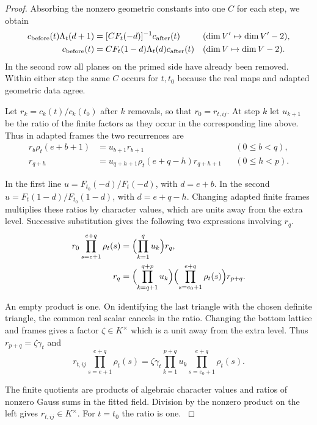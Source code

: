 \begin{proof}
Absorbing the nonzero geometric constants into one \(C\) for each
step, we obtain
\[
 \begin{aligned}
 c_{\rm before}(t)\Lambda_t(d+1)
       &=[C F_t(-d)]^{-1} c_{\rm after}(t)
       &&(\dim V'\mapsto\dim V'-2),\\
 c_{\rm before}(t)
       &= C F_t(1-d)\Lambda_t(d)c_{\rm after}(t)
       &&(\dim V\mapsto\dim V-2).
 \end{aligned}
\]
In the second row all planes on the primed side have already
been removed. Within either step the same \(C\) occurs for
\(t,t_0\) because the real maps and adapted geometric data agree.

Let \(r_k=c_k(t)/c_k(t_0)\) after \(k\) removals, so that
\(r_0=r_{t,ij}\). At step \(k\) let \(u_{k+1}\) be the ratio of
the finite factors as they occur in the corresponding line above.
Thus in adapted frames the two recurrences are
\[
\begin{aligned}
 r_b\rho_t(e+b+1)&=u_{b+1}r_{b+1} &&(0\le b<q),\\
 r_{q+h}&=u_{q+h+1}\rho_t(e+q-h)r_{q+h+1} &&(0\le h<p).
\end{aligned}
\]

In the first line \(u=F_{t_0}(-d)/F_t(-d)\), with \(d=e+b\).
In the second \(u=F_t(1-d)/F_{t_0}(1-d)\), with \(d=e+q-h\).
Changing adapted finite frames multiplies these ratios by character
values, which are units away from the extra level. Successive
substitution gives the following two expressions involving \(r_q\).
\[
\begin{aligned}
 r_0\prod_{s=e+1}^{e+q}\rho_t(s)
   &=\Bigl(\prod_{k=1}^{q}u_k\Bigr)r_q,\\
 r_q&=\Bigl(\prod_{k=q+1}^{q+p}u_k\Bigr)
         \Bigl(\prod_{s=e_0+1}^{e+q}\rho_t(s)\Bigr)r_{p+q}.
\end{aligned}
\]

An empty product is one. On identifying the last triangle with the
chosen definite triangle, the common real scalar cancels in the ratio.
Changing the bottom lattice and frames gives a factor \(\zeta\in K^\times\)
which is a unit away from the extra level. Thus
\(r_{p+q}=\zeta\gamma_t\) and
\begin{equation}\label{eq:fitted-square-tower}
 r_{t,ij}\prod_{s=e+1}^{e+q}\rho_t(s)
     =\zeta\gamma_t\prod_{k=1}^{p+q}u_k
                        \prod_{s=e_0+1}^{e+q}\rho_t(s).
\end{equation}

The finite quotients are products of algebraic character values and
ratios of nonzero Gauss sums in the fitted field. Division by the
nonzero product on the left gives \(r_{t,ij}\in K^\times\).
For \(t=t_0\) the ratio is one. \label{cor:fitted-square-ratios-2}

\end{proof}

